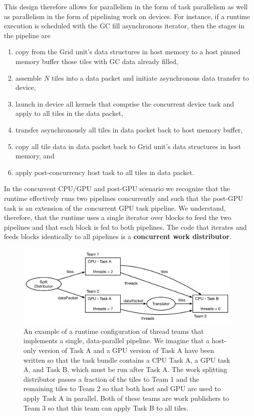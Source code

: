 \documentclass{article}
\begin{document}
This design therefore allows for parallelism in the form of task parallelism as
well as parallelism in the form of pipelining work on devices.  For instance, if a
runtime execution is scheduled with the GC fill asynchronous iterator, then the
stages in the pipeline are
\begin{enumerate}
\item{copy from the Grid unit's data structures in host memory to a host pinned memory
buffer those tiles with GC data already filled,}
\item{assemble $N$ tiles into a data packet and initiate asynchronous data
transfer to device,}
\item{launch in device all kernels that comprise the concurrent device task and
apply to all tiles in the data packet,}
\item{transfer asynchronously all tiles in data packet back to host memory
buffer,}
\item{copy all tile data in data packet back to Grid unit's data structures in
host memory, and}
\item{apply post-concurrency host task to all tiles in data packet.}
\end{enumerate}

In the concurrent CPU/GPU and post-GPU scenario we recognize that the runtime
effectively runs two pipelines concurrently and such that the post-GPU task is
an extension of the concurrent GPU task pipeline.  We understand, therefore,
that the runtime uses a single iterator over blocks to feed the two pipelines
and that each block is fed to both pipelines.  The code that iterates and feeds
blocks identically to all pipelines is a \textbf{concurrent work distributor}.\\

\begin{figure}[!ht]
\begin{center}
\includegraphics[width=5.5in]{WorkSplittingExample.pdf}
\caption[]{An example of a runtime configuration of thread teams that implements
a single, data-parallel pipeline.  We imagine that a host-only version of Task A
and a GPU version of Task A have been written so that the task bundle contains a
CPU Task A, a GPU task A, and Task B, which must be run after Task A.  The work
splitting distributor passes a fraction of the tiles to Team 1 and the
remaining tiles to Team 2 so that both host and GPU are used to apply Task A in
parallel.  Both of these teams are work publishers to Team 3 so
that this team can apply Task B to all tiles.}
\label{fig:SplitItor}
\end{center}
\end{figure}
\end{document}
